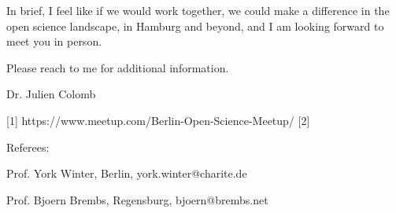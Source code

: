 In brief, I feel like if we would work together, we could make a difference in the open science landscape, in Hamburg and beyond,
and I am looking forward to meet you in person.

Please reach to me for additional information.

Dr. Julien Colomb

[1] https://www.meetup.com/Berlin-Open-Science-Meetup/
[2]


\vspace {1.5cm} 

Referees:

Prof. York Winter, Berlin, york.winter@charite.de
 
 
Prof. Bjoern Brembs, Regensburg, bjoern@brembs.net
